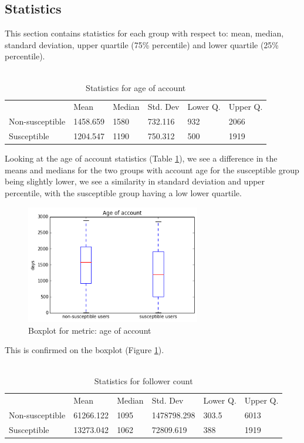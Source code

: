 \documentclass[10pt]{IEEEtran}
\begin{document}
\subsection{Statistics}
This section contains statistics for each group with respect to: mean, median, standard deviation, upper quartile (75\% percentile) and lower quartile (25\% percentile).\\\\


\begin{table}[H]
\begin{tabular}{llllll}
\textbf{}       & Mean     & Median & Std. Dev & Lower Q. & Upper Q. \\
Non-susceptible & 1458.659 & 1580   & 732.116  & 932     & 2066      \\
Susceptible     & 1204.547 & 1190   & 750.312  &  500    &   1919   
\end{tabular}
\caption{Statistics for age of account}
\label{tab:age_of_account}
\end{table}

Looking at the age of account statistics (Table \ref{tab:age_of_account}), we see a difference in the means and medians for the two groups with account age for the susceptible group being slightly lower, we see a similarity in standard deviation and upper percentile, with the susceptible group having a low lower quartile.

\begin{figure}[H]
  \centering
  \includegraphics[width=3.0in]{age_of_account_boxplot}
  \caption{Boxplot for metric: age of account}
  \label{fig:age_boxplot}
\end{figure}
This is confirmed on the boxplot (Figure \ref{fig:age_boxplot}).\\\\
\begin{table}[H]

\begin{tabular}{llllll}
\textbf{}       & Mean      & Median & Std. Dev    & Lower Q. & Upper Q. \\
Non-susceptible & 61266.122 & 1095   & 1478798.298 & 303.5    &  6013    \\
Susceptible     & 13273.042 & 1062   & 72809.619   & 388     &   1919   
\end{tabular}
\caption{Statistics for follower count}
\label{tab:follower_count}
\end{table}
\end{document}
